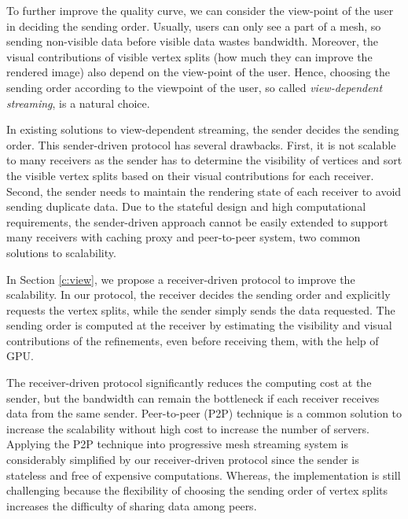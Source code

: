 \documentclass{sig-alt-release2}
\begin{document}
    To further improve the quality curve,
    we can consider the view-point of the 
    user in deciding the sending order.
    Usually, users can only see a part of a mesh, so sending non-visible data
    before visible data wastes bandwidth. Moreover, the visual contributions of visible
    vertex splits (how much they can improve the rendered image)
    also depend on the view-point of the user.
    Hence, choosing the sending order according to the viewpoint of the user, so called
    \emph{view-dependent streaming}, is a natural choice.
    
    In existing solutions to view-dependent streaming,  the
    sender decides the sending order. This sender-driven protocol has several
    drawbacks. First, it is not scalable to many receivers as the sender has to
    determine the visibility of vertices and sort the visible vertex splits based on their
    visual contributions for each receiver. 
    Second, the sender needs to maintain
    the rendering state of each receiver to avoid sending duplicate data. 
    Due to the stateful design and high computational requirements,
    the sender-driven approach cannot be easily extended to support 
    many receivers with caching proxy and peer-to-peer system,
    two common solutions to scalability. 

    In Section \ref{c:view}, we propose a receiver-driven protocol to 
    improve the scalability. In our protocol, the receiver decides the sending order
    and explicitly requests the vertex splits, 
    while the sender simply sends the data requested.
    The sending order is computed at the receiver  by estimating the visibility
    and visual contributions of the refinements, even before receiving them,
    with the help of GPU.

    The receiver-driven protocol significantly reduces the computing cost at the sender,
    but the bandwidth can remain the bottleneck if each receiver receives data
    from the same sender. Peer-to-peer (P2P) technique is a common solution to increase
    the scalability without high cost to increase the number of servers. 
    Applying the P2P technique into progressive mesh streaming system
    is considerably simplified by our receiver-driven protocol since 
    the sender is stateless and free of expensive computations.
    Whereas, the implementation is still challenging because the flexibility
    of choosing the sending order of 
    vertex splits increases the difficulty of sharing data among peers. 
    
\end{document}
